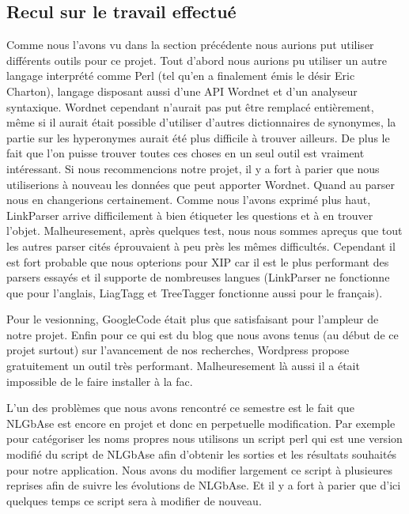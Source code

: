 \documentclass[10pt,a4paper]{article}
\begin{document}
\subsection{Recul sur le travail effectué}
\par Comme nous l'avons vu dans la section précédente nous aurions put utiliser différents outils pour ce projet. Tout d'abord nous aurions pu utiliser un autre langage interprété comme Perl (tel qu'en a finalement émis le désir Eric Charton), langage disposant aussi d'une API Wordnet et d'un analyseur syntaxique. Wordnet cependant n'aurait pas put être remplacé entièrement, même si il aurait était possible d'utiliser d'autres dictionnaires de synonymes, la partie sur les hyperonymes aurait été plus difficile à trouver ailleurs. De plus le fait que l'on puisse trouver toutes ces choses en un seul outil est vraiment intéressant. Si nous recommencions notre projet, il y a fort à parier que nous utiliserions à nouveau les données que peut apporter Wordnet. Quand au parser nous en changerions certainement. Comme nous l'avons exprimé plus haut, LinkParser arrive difficilement à bien étiqueter les questions et à en trouver l'objet. Malheuresement, après quelques test, nous nous sommes apreçus que tout les autres parser cités éprouvaient à peu près les mêmes difficultés. Cependant il est fort probable que nous opterions pour XIP car il est le plus performant des parsers essayés et il supporte de nombreuses langues (LinkParser ne fonctionne que pour l'anglais, LiagTagg et TreeTagger fonctionne aussi pour le français).
\par Pour le vesionning, GoogleCode était plus que satisfaisant pour l'ampleur de notre projet. Enfin pour ce qui est du blog que nous avons tenus (au début de ce projet surtout) sur l'avancement de nos recherches, Wordpress propose gratuitement un outil très performant. Malheuresement là aussi il a était impossible de le faire installer à la fac.
\par L'un des problèmes que nous avons rencontré ce semestre est le fait que NLGbAse est encore en projet et donc en perpetuelle modification. Par exemple pour catégoriser les noms propres nous utilisons un script perl qui est une version modifié du script de NLGbAse afin d'obtenir les sorties et les résultats souhaités pour notre application. Nous avons du modifier largement ce script à plusieures reprises afin de suivre les évolutions de NLGbAse. Et il y a fort à parier que d'ici quelques temps ce script sera à modifier de nouveau. 
\end{document}
